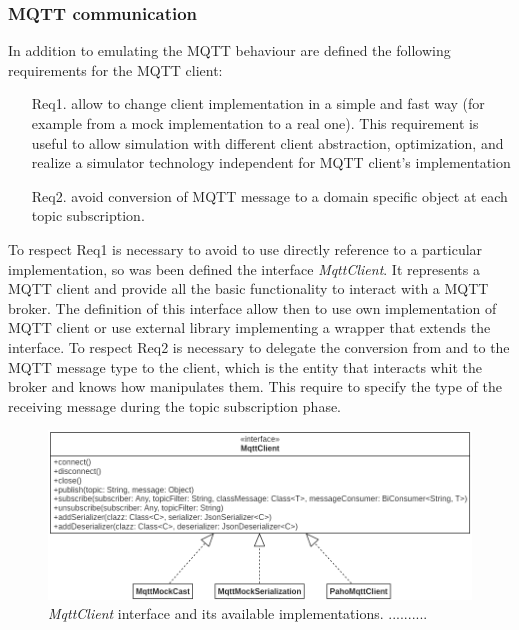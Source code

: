 \subsubsection{MQTT communication}
In addition to emulating the MQTT behaviour are defined the following requirements for the MQTT client:
\begin{itemize}
    \item[Req1.] allow to change client implementation in a simple and fast way (for example from a mock implementation to a real one). 
    This requirement is useful to allow simulation with different client abstraction, optimization, and realize a simulator technology independent for MQTT client's implementation
    \item[Req2.] avoid conversion of MQTT message to a domain specific object at each topic \mbox{subscription}.
\end{itemize}
To respect Req1 is necessary to avoid to use directly reference to a particular implementation, so was been defined the interface \mbox{\textit{MqttClient}}.
It represents a MQTT client and provide all the basic functionality to interact with a MQTT broker. 
The definition of this interface allow then to use own implementation of MQTT client or use external library implementing a wrapper that extends the interface.
To respect Req2 is necessary to delegate the conversion from and to the MQTT message type to the client, which is the entity that interacts whit the broker and knows how manipulates them. This require to specify the type of the receiving message during the topic subscription phase.
\begin{figure}[h]
    \centering
    \includegraphics[width=\textwidth]{figures/mqttClient.png}
    \caption{\textit{MqttClient} interface and its available implementations.\-
    ..........}
    \label{fig:mqtt}
\end{figure}

